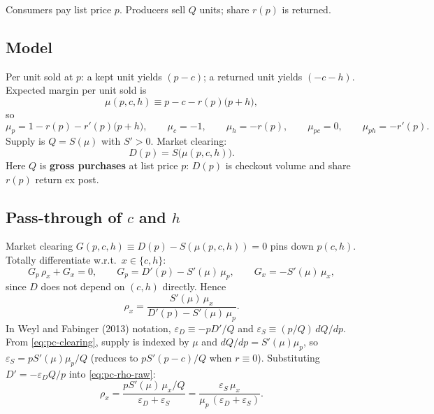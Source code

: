 \documentclass[11pt]{article}
\begin{document}
Consumers pay list price $p$.  Producers sell $Q$ units; share $r(p)$ is
returned.

\subsection{Model}

Per unit sold at $p$: a kept unit yields $(p-c)$; a returned unit yields
$(-c-h)$.  Expected margin per unit sold is
\[
  \mu(p,c,h) \equiv p - c - r(p)\bigl(p+h\bigr),
\]
so
\[
  \mu_p = 1 - r(p) - r'(p)\bigl(p+h\bigr),
  \qquad
  \mu_c = -1,
  \qquad
  \mu_h = -r(p),
  \qquad
  \mu_{pc} = 0,
  \qquad
  \mu_{ph} = -r'(p).
\]
Supply is $Q=S(\mu)$ with $S'>0$.  Market clearing:
\begin{equation}
  D(p) = S\bigl(\mu(p,c,h)\bigr).
  \label{eq:pc-clearing}
\end{equation}
Here $Q$ is \textbf{gross purchases} at list price $p$: $D(p)$ is checkout
volume and share $r(p)$ return ex post.

\subsection{Pass-through of $c$ and $h$}

Market clearing $G(p,c,h)\equiv D(p)-S(\mu(p,c,h))=0$ pins down $p(c,h)$.
Totally differentiate w.r.t.\ $x\in\{c,h\}$:
\[
  G_p\,\rho_x + G_x = 0,
  \qquad
  G_p = D'(p) - S'(\mu)\,\mu_p,
  \qquad
  G_x = -S'(\mu)\,\mu_x,
\]
since $D$ does not depend on $(c,h)$ directly.  Hence
\begin{equation}
  \rho_x
  = \frac{S'(\mu)\,\mu_x}{D'(p)-S'(\mu)\,\mu_p}.
  \label{eq:pc-rho-raw}
\end{equation}
In Weyl and Fabinger (2013) notation,
$\varepsilon_D\equiv -pD'/Q$ and
$\varepsilon_S\equiv (p/Q)\,dQ/dp$.
From \eqref{eq:pc-clearing}, supply is indexed by $\mu$ and
$dQ/dp=S'(\mu)\mu_p$, so
$\varepsilon_S=pS'(\mu)\mu_p/Q$
(reduces to $pS'(p-c)/Q$ when $r\equiv 0$).
Substituting $D'=-\varepsilon_D Q/p$ into \eqref{eq:pc-rho-raw}:
\begin{equation}
  \rho_x
  = \frac{pS'(\mu)\,\mu_x/Q}{\varepsilon_D+\varepsilon_S}
  = \frac{\varepsilon_S\,\mu_x}{\mu_p\,(\varepsilon_D+\varepsilon_S)}.
  \label{eq:pc-rho}
\end{equation}
\end{document}
